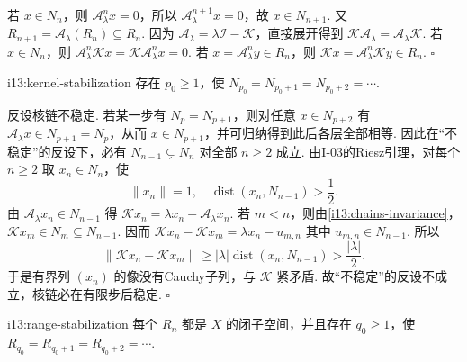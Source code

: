\begin{FAProof}
若 \(\displaystyle x\in N_n\)，则 \(\displaystyle \mathcal A_\lambda^nx=0\)，所以 \(\displaystyle \mathcal A_\lambda^{n+1}x=0\)，故 \(\displaystyle x\in N_{n+1}\). 又 \(\displaystyle R_{n+1}=\mathcal A_\lambda(R_n)\subseteq R_n\). 因为 \(\displaystyle \mathcal A_\lambda=\lambda\mathcal I-\mathcal K\)，直接展开得到 \(\displaystyle \mathcal K\mathcal A_\lambda=\mathcal A_\lambda\mathcal K\). 若 \(\displaystyle x\in N_n\)，则 \(\displaystyle \mathcal A_\lambda^n\mathcal Kx=\mathcal K\mathcal A_\lambda^nx=0\). 若 \(\displaystyle x=\mathcal A_\lambda^ny\in R_n\)，则 \(\displaystyle \mathcal Kx=\mathcal A_\lambda^n\mathcal Ky\in R_n\).
\hfill\(\square\)
\end{FAProof}

\begin{FALemma}[B][核链稳定]{i13:kernel-stabilization}
存在 \(\displaystyle p_0\geqslant1\)，使
\(\displaystyle N_{p_0}=N_{p_0+1}=N_{p_0+2}=\cdots\).
\end{FALemma}

\begin{FAProof}
反设核链不稳定. 若某一步有 \(\displaystyle N_p=N_{p+1}\)，则对任意 \(\displaystyle x\in N_{p+2}\) 有 \(\displaystyle \mathcal A_\lambda x\in N_{p+1}=N_p\)，从而 \(\displaystyle x\in N_{p+1}\)，并可归纳得到此后各层全部相等. 因此在“不稳定”的反设下，必有 \(\displaystyle N_{n-1}\subsetneq N_n\) 对全部 \(\displaystyle n\geqslant2\) 成立. 由I-03的Riesz引理，对每个 \(\displaystyle n\geqslant2\) 取 \(\displaystyle x_n\in N_n\)，使
\[
\|x_n\|=1,
\quad
\operatorname{dist}(x_n,N_{n-1})>\frac{1}{2}.
\]
由 \(\displaystyle \mathcal A_\lambda x_n\in N_{n-1}\) 得
\(\displaystyle \mathcal Kx_n = \lambda x_n-\mathcal A_\lambda x_n\).
若 \(\displaystyle m<n\)，则由\autoref{i13:chains-invariance}，\(\displaystyle \mathcal Kx_m\in N_m\subseteq N_{n-1}\). 因而
\(\displaystyle \mathcal Kx_n-\mathcal Kx_m = \lambda x_n-u_{m,n}\)
其中 \(\displaystyle u_{m,n}\in N_{n-1}\). 所以
\[
\|\mathcal Kx_n-\mathcal Kx_m\|
\geqslant
|\lambda|\operatorname{dist}(x_n,N_{n-1})
>
\frac{|\lambda|}{2}.
\]
于是有界列 \(\displaystyle (x_n)\) 的像没有Cauchy子列，与 \(\displaystyle \mathcal K\) 紧矛盾. 故“不稳定”的反设不成立，核链必在有限步后稳定.
\hfill\(\square\)
\end{FAProof}

\begin{FALemma}[B][值域链闭且稳定]{i13:range-stabilization}
每个 \(\displaystyle R_n\) 都是 \(\displaystyle X\) 的闭子空间，并且存在 \(\displaystyle q_0\geqslant1\)，使
\(\displaystyle R_{q_0}=R_{q_0+1}=R_{q_0+2}=\cdots\).
\end{FALemma}

